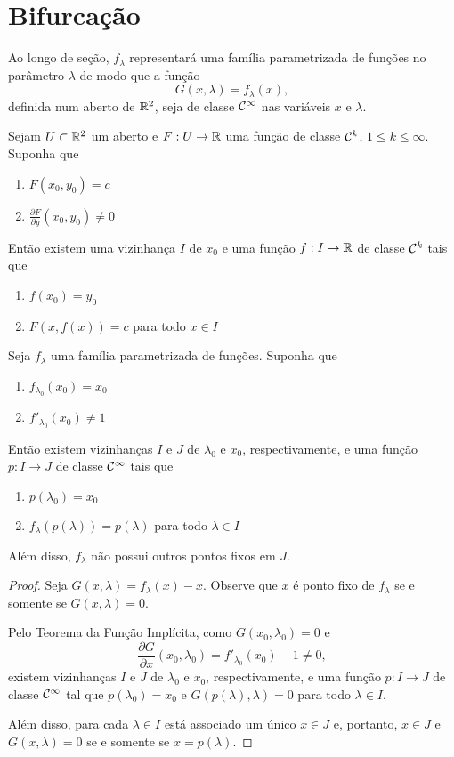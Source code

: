 \section{Bifurcação}

Ao longo de seção, $f_\lambda$ representará uma família parametrizada de funções no parâmetro $\lambda$ de modo que a função
$$G(x, \lambda) = f_\lambda(x),$$
definida num aberto de $\mathbb{R}^2$, seja de classe $\mathcal{C}^\infty$ nas variáveis $x$ e $\lambda$.

\begin{theorem}
Sejam $U \subset \mathbb{R}^2$ um aberto e $F: U \to \mathbb{R}$ uma função de classe $\mathcal{C}^k$, $1 \leq k \leq \infty$. Suponha que
\begin{enumerate}
\item $F(x_0, y_0) = c$
\item $\frac{\partial F}{\partial y} (x_0, y_0) \neq 0$
\end{enumerate} 
Então existem uma vizinhança $I$ de $x_0$ e uma função $f: I \to \mathbb{R}$ de classe $\mathcal{C}^k$ tais que
\begin{enumerate}
\item $f(x_0) = y_0$
\item $F(x, f(x)) = c$ para todo $x \in I$
\end{enumerate}
\end{theorem}

\begin{theorem}
\label{theorem1}
Seja $f_\lambda$ uma família parametrizada de funções. Suponha que \begin{enumerate}
\item $f_{\lambda_0}(x_0) = x_0$
\item $f'_{\lambda_0}(x_0) \neq 1$ 
\end{enumerate}
Então existem vizinhanças $I$ e $J$ de $\lambda_0$ e $x_0$, respectivamente, e uma função $p: I \to J$ de classe $\mathcal{C}^\infty$ tais que
\begin{enumerate}
\item $p(\lambda_0) = x_0$ 
\item $f_\lambda(p(\lambda)) = p(\lambda)$ para todo $\lambda \in I$
\end{enumerate}
Além disso, $f_\lambda$ não possui outros pontos fixos em $J$.
\end{theorem}

\begin{proof}
Seja $G(x, \lambda) = f_\lambda(x) - x$. Observe que $x$ é ponto fixo de $f_\lambda$ se e somente se $G(x, \lambda) = 0$.

Pelo Teorema da Função Implícita, como $G(x_0, \lambda_0) = 0$ e
$$\frac{\partial G}{\partial x} (x_0, \lambda_0) = f'_{\lambda_0}(x_0) - 1 \neq 0,$$
existem vizinhanças $I$ e $J$ de $\lambda_0$ e $x_0$, respectivamente, e uma função $p: I \to J$ de classe $\mathcal{C}^\infty$ tal que $p(\lambda_0) = x_0$ e $G(p(\lambda), \lambda) = 0$ para todo $\lambda \in I$.

Além disso, para cada $\lambda \in I$ está associado um único $x \in J$ e, portanto, $x \in J$ e $G(x, \lambda) = 0$ se e somente se $x = p(\lambda)$.
\end{proof}

